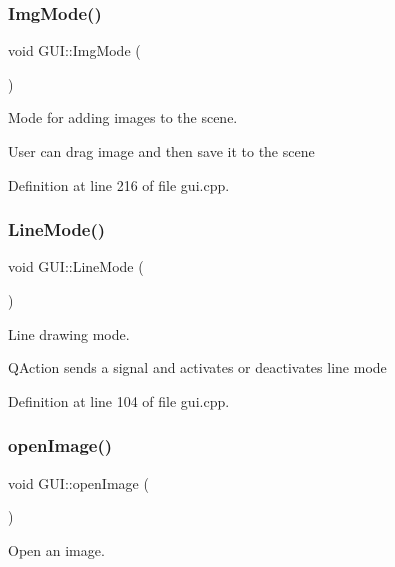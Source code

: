 \mbox{\label{classGUI_a5281fa4256d3ff14df9a95c1c6613bb2}} 
\subsubsection{\texorpdfstring{Img\+Mode()}{ImgMode()}}
{\footnotesize\ttfamily void G\+U\+I\+::\+Img\+Mode (\begin{DoxyParamCaption}{ }\end{DoxyParamCaption})}



Mode for adding images to the scene. 

User can drag image and then save it to the scene 

Definition at line 216 of file gui.\+cpp.

\mbox{\label{classGUI_a91fab5d31617ad5631d17dfceb5a0fad}} 
\subsubsection{\texorpdfstring{Line\+Mode()}{LineMode()}}
{\footnotesize\ttfamily void G\+U\+I\+::\+Line\+Mode (\begin{DoxyParamCaption}{ }\end{DoxyParamCaption})}



Line drawing mode. 

Q\+Action sends a signal and activates or deactivates line mode 

Definition at line 104 of file gui.\+cpp.

\mbox{\label{classGUI_a925c89bd7b32ccc8d726063ed8076f8f}} 
\subsubsection{\texorpdfstring{open\+Image()}{openImage()}}
{\footnotesize\ttfamily void G\+U\+I\+::open\+Image (\begin{DoxyParamCaption}{ }\end{DoxyParamCaption})}



Open an image. 

